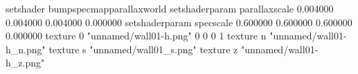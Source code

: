 setshader bumpspecmapparallaxworld
setshaderparam parallaxscale 0.004000 0.004000 0.004000 0.000000
setshaderparam specscale 0.600000 0.600000 0.600000 0.000000
texture 0 "unnamed/wall01-h.png" 0 0 0 1
texture n "unnamed/wall01-h_n.png"
texture s "unnamed/wall01_s.png"
texture z "unnamed/wall01-h_z.png"
